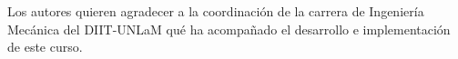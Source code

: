 Los autores quieren agradecer a la coordinación de la carrera de Ingeniería Mecánica del DIIT-UNLaM qué ha acompañado el desarrollo e implementación de este curso.